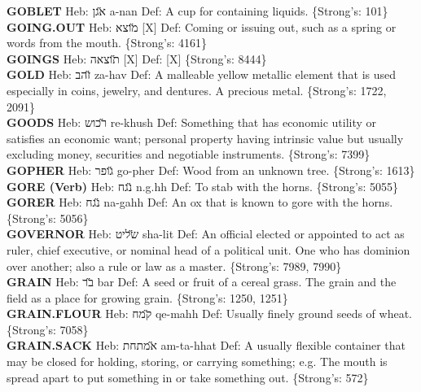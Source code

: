 {\textbf{GOBLET} Heb: {\large\H אגן} a-nan Def: A cup for containing liquids. \{Strong's: 101\}\hfill{}\\

\textbf{GOING.OUT} Heb: {\large\H מוצא} {[}X{]} Def: Coming or issuing out, such as a spring or words from the mouth. \{Strong's: 4161\}\hfill{}\\

\textbf{GOINGS} Heb: {\large\H תוצאה} {[}X{]} Def: {[}X{]} \{Strong's: 8444\}\hfill{}\\

\textbf{GOLD} Heb: {\large\H זהב} za-hav Def: A malleable yellow metallic element that is used especially in coins, jewelry, and dentures. A precious metal. \{Strong's: 1722, 2091\}\hfill{}\\

\textbf{GOODS} Heb: {\large\H רכוש} re-khush Def: Something that has economic utility or satisfies an economic want; personal property having intrinsic value but usually excluding money, securities and negotiable instruments. \{Strong's: 7399\}\hfill{}\\

\textbf{GOPHER} Heb: {\large\H גופר} go-pher Def: Wood from an unknown tree. \{Strong's: 1613\}\hfill{}\\

\textbf{GORE (Verb)} Heb: {\large\H נגח} n.g.hh Def: To stab with the horns. \{Strong's: 5055\}\hfill{}\\

\textbf{GORER} Heb: {\large\H נגח} na-gahh Def: An ox that is known to gore with the horns. \{Strong's: 5056\}\hfill{}\\

\textbf{GOVERNOR} Heb: {\large\H שליט} sha-lit Def: An official elected or appointed to act as ruler, chief executive, or nominal head of a political unit. One who has dominion over another; also a rule or law as a master. \{Strong's: 7989, 7990\}\hfill{}\\

\textbf{GRAIN} Heb: {\large\H בר} bar Def: A seed or fruit of a cereal grass. The grain and the field as a place for growing grain. \{Strong's: 1250, 1251\}\hfill{}\\

\textbf{GRAIN.FLOUR} Heb: {\large\H קמח} qe-mahh Def: Usually finely ground seeds of wheat. \{Strong's: 7058\}\hfill{}\\

\textbf{GRAIN.SACK} Heb: {\large\H אמתחת} am-ta-hhat Def: A usually flexible container that may be closed for holding, storing, or carrying something; e.g. The mouth is spread apart to put something in or take something out. \{Strong's: 572\}\hfill{}\\

}
